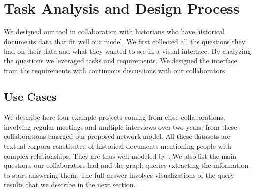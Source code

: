 \section{Task Analysis and Design Process}\label{sec:tasks}

We designed our tool in collaboration with historians who have historical documents data that fit well our \model model. We first collected all the questions they had on their data and what they wanted to see in a visual interface. By analyzing the questions we leveraged tasks and requirements. We designed the interface from the requirements with continuous discussions with our collaborators.

\subsection{Use Cases}

We describe here four example projects coming from close collaborations, involving regular meetings and multiple interviews over two years; from these collaborations emerged our proposed network model. All these datasets are textual corpora constituted of historical documents mentioning people with complex relationships. They are thus well modeled by \model.  We also list the main questions our collaborators had and the graph queries extracting the information to start answering them. The full answer involves visualizations of the query results that we describe in the next section.


